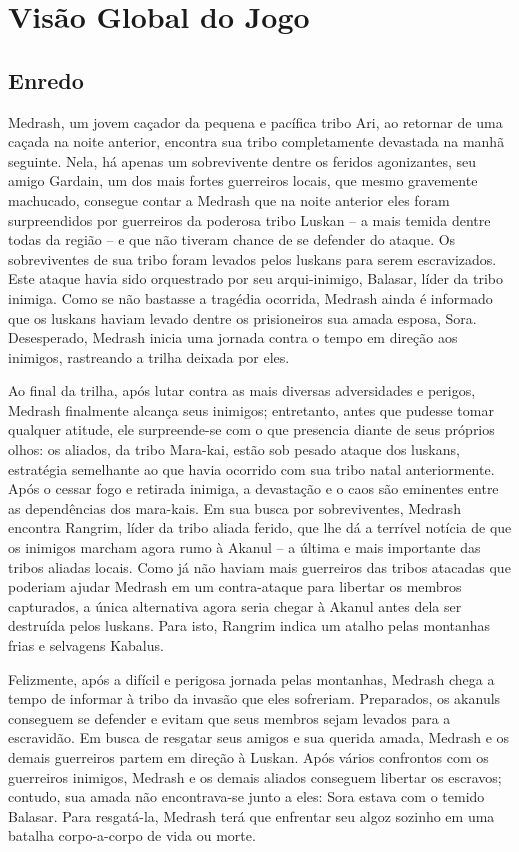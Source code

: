 \section{Visão Global do Jogo}

\subsection{Enredo}
Medrash, um jovem caçador da pequena e pacífica tribo Ari, ao retornar de uma caçada na noite anterior, encontra sua tribo completamente devastada na manhã seguinte. Nela, há apenas um sobrevivente dentre os feridos agonizantes, seu amigo Gardain, um dos mais fortes guerreiros locais, que mesmo gravemente machucado, consegue contar a Medrash que na noite anterior eles foram surpreendidos por guerreiros da poderosa tribo Luskan – a mais temida dentre todas da região – e que não tiveram chance de se defender do ataque. Os sobreviventes de sua tribo foram levados pelos luskans para serem escravizados. Este ataque havia sido orquestrado por seu arqui-inimigo, Balasar, líder da tribo inimiga. Como se não bastasse a tragédia ocorrida, Medrash ainda é informado que os luskans haviam levado dentre os prisioneiros sua amada esposa, Sora.  Desesperado, Medrash inicia uma jornada contra o tempo em direção aos inimigos, rastreando a trilha deixada por eles. 

Ao final da trilha, após lutar contra as mais diversas adversidades e perigos, Medrash finalmente alcança seus inimigos; entretanto, antes que pudesse tomar qualquer atitude, ele  surpreende-se com o que presencia diante de seus próprios olhos: os aliados, da tribo Mara-kai, estão sob pesado ataque dos luskans, estratégia semelhante ao que havia ocorrido com sua tribo natal anteriormente. Após o cessar fogo e retirada inimiga, a devastação e o caos são eminentes entre as dependências dos mara-kais. Em sua busca por sobreviventes, Medrash encontra Rangrim, líder da tribo aliada ferido, que lhe dá a terrível notícia de que os inimigos marcham agora rumo à Akanul – a última e mais importante das tribos aliadas locais. Como já não haviam mais guerreiros das tribos atacadas que poderiam ajudar Medrash em um contra-ataque para libertar os membros capturados, a única alternativa agora seria chegar à Akanul antes dela ser destruída pelos luskans. Para isto, Rangrim indica um atalho pelas montanhas frias e selvagens Kabalus. 

Felizmente, após a difícil e perigosa jornada pelas montanhas, Medrash chega a tempo de informar à tribo da invasão que eles sofreriam. Preparados, os akanuls conseguem se defender e evitam que seus membros sejam levados para a escravidão. Em busca de resgatar seus amigos e sua querida amada, Medrash e os demais guerreiros partem em direção à Luskan. Após vários confrontos com os guerreiros inimigos, Medrash e os demais aliados conseguem libertar os escravos; contudo, sua amada não encontrava-se junto a eles: Sora estava com o temido Balasar. Para resgatá-la, Medrash terá que enfrentar seu algoz sozinho em uma batalha corpo-a-corpo de vida ou morte.
